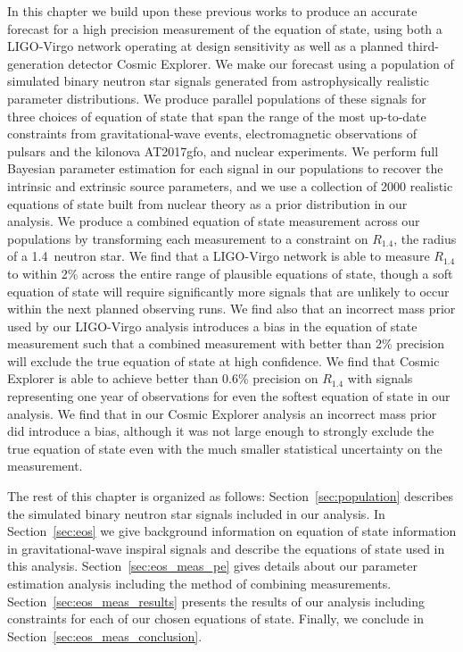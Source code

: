 In this chapter we build upon these previous works to produce an accurate forecast for a high precision measurement of the equation of state, using both a LIGO-Virgo network operating at design sensitivity as well as a planned third-generation detector Cosmic Explorer. We make our forecast using a population of simulated binary neutron star signals generated from astrophysically realistic parameter distributions. We produce parallel populations of these signals for three choices of equation of state that span the range of the most up-to-date constraints from gravitational-wave events, electromagnetic observations of pulsars and the kilonova AT2017gfo, and nuclear experiments. We perform full Bayesian parameter estimation for each signal in our populations to recover the intrinsic and extrinsic source parameters, and we use a collection of 2000 realistic equations of state built from nuclear theory as a prior distribution in our analysis. We produce a combined equation of state measurement across our populations by transforming each measurement to a constraint on $R_{1.4}$, the radius of a 1.4\msun~neutron star. We find that a LIGO-Virgo network is able to measure $R_{1.4}$ to within 2\% across the entire range of plausible equations of state, though a soft equation of state will require significantly more signals that are unlikely to occur within the next planned observing runs. We find also that an incorrect mass prior used by our LIGO-Virgo analysis introduces a bias in the equation of state measurement such that a combined measurement with better than 2\% precision will exclude the true equation of state at high confidence. We find that Cosmic Explorer is able to achieve better than 0.6\% precision on $R_{1.4}$ with signals representing one year of observations for even the softest equation of state in our analysis. We find that in our Cosmic Explorer analysis an incorrect mass prior did introduce a bias, although it was not large enough to strongly exclude the true equation of state even with the much smaller statistical uncertainty on the measurement.

The rest of this chapter is organized as follows: Section~\ref{sec:population} describes the simulated binary neutron star signals included in our analysis. In Section~\ref{sec:eos} we give background information on equation of state information in gravitational-wave inspiral signals and describe the equations of state used in this analysis. Section~\ref{sec:eos_meas_pe} gives details about our parameter estimation analysis including the method of combining measurements. Section~\ref{sec:eos_meas_results} presents the results of our analysis including constraints for each of our chosen equations of state. Finally, we conclude in Section~\ref{sec:eos_meas_conclusion}.

